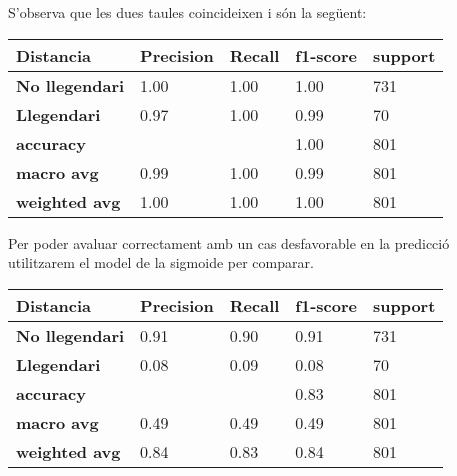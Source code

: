 \documentclass[a4paper, 11pt]{article}
\begin{document}
        S'observa que les dues taules coincideixen i són la següent:
        \begin{table}[H]
            \centering
            \begin{tabular}{|l|l|l|l|l|}
            \hline
            \textbf{Distancia}     & \textbf{Precision} & \textbf{Recall} & \textbf{f1-score} & \textbf{support} \\ \hline
            \textbf{No llegendari} & 1.00               & 1.00            & 1.00              & 731              \\ \hline
            \textbf{Llegendari}    & 0.97               & 1.00            & 0.99              & 70               \\ \hline
            \textbf{accuracy}      &                    &                 & 1.00              & 801              \\ \hline
            \textbf{macro avg}     & 0.99               & 1.00            & 0.99              & 801              \\ \hline
            \textbf{weighted avg}  & 1.00               & 1.00            & 1.00              & 801              \\ \hline
            \end{tabular}
        \end{table}

        \newpage
        Per poder avaluar correctament amb un cas desfavorable en la predicció utilitzarem el model de la sigmoide per comparar.

        \begin{table}[H]
            \centering
            \begin{tabular}{|l|l|l|l|l|}
            \hline
            \textbf{Distancia}     & \textbf{Precision} & \textbf{Recall} & \textbf{f1-score} & \textbf{support} \\ \hline
            \textbf{No llegendari} & 0.91               & 0.90            & 0.91              & 731              \\ \hline
            \textbf{Llegendari}    & 0.08               & 0.09            & 0.08              & 70               \\ \hline
            \textbf{accuracy}      &                    &                 & 0.83              & 801              \\ \hline
            \textbf{macro avg}     & 0.49               & 0.49            & 0.49              & 801              \\ \hline
            \textbf{weighted avg}  & 0.84               & 0.83            & 0.84              & 801              \\ \hline
            \end{tabular}
        \end{table}
\end{document}
